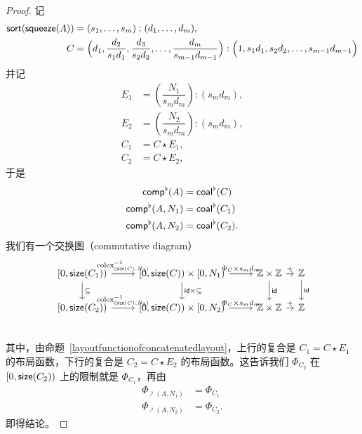 \begin{proof}
    记
    \begin{align*}
    \mathsf{sort}(\mathsf{squeeze}(A)) & = (s_1,\dots,s_m):(d_1,\dots,d_m), \\
    C & = \Bigl(d_1 , \dfrac{d_2}{s_1d_1} , \dfrac{d_3}{s_2d_2} , \dots ,\dfrac{d_m}{s_{m-1}d_{m-1}} \Bigr) : \Bigl(1 , s_1d_1 , s_2d_2, \dots ,s_{m-1}d_{m-1}\Bigr)
    \end{align*}
    并记
    \begin{align*}
    E_1 & = \left( \dfrac{N_1}{s_md_m}\right):(s_md_m), \\
    E_2 & = \left( \dfrac{N_2}{s_md_m}\right):(s_md_m), \\
    C_1 & = C \star E_1,\\
    C_2 & = C \star E_2,
    \end{align*}
    于是
    \begin{align*}
        \mathsf{comp}^\flat (A) & = \mathsf{coal}^\flat(C)\\
        \mathsf{comp}^\flat(A,N_1) & = \mathsf{coal}^\flat(C_1)\\
        \mathsf{comp}^\flat(A,N_2) & = \mathsf{coal}^\flat(C_2).
    \end{align*}
    我们有一个交换图（commutative diagram）
    \[\begin{tikzcd}[column sep=0.8em]  %
    {[}0,\size(C_1){)}\ar[rrr,"\text{colex}_{(\size(C),N_1)}^{-1}"] \ar[d,"\subseteq"] & & & {[}0,\size(C){)} \times {[}0,N_1 {)} \ar[rrr,"\Phi_C \times s_md_m "] \ar[d,"\id \times \subseteq"] & & & \mathbb{Z} \times \mathbb{Z} \ar[r,"+"] \ar[d,"\id" ] & \mathbb{Z} \ar[d,"\id"] \\
    {[}0,\size(C_2){)}\ar[rrr,"\text{colex}_{(\size(C),N_2)}^{-1}"] & & & {[}0,\size(C){)} \times {[}0,N_2 {)} \ar[rrr,"\Phi_C \times s_md_m "] & & & \mathbb{Z} \times \mathbb{Z} \ar[r,"+"] & \mathbb{Z} \\
    \end{tikzcd} \]
    其中，由命题~\ref{layoutfunctionofconcatenatedlayout}，上行的复合是 $C_1 = C \star E_1$ 的布局函数，下行的复合是 $C_2 = C \star E_2$ 的布局函数。这告诉我们 $\Phi_{C_2}$ 在 $[0,\mathsf{size}(C_2))$ 上的限制就是 $\Phi_{C_1}$，再由
    \begin{align*}
    \Phi_{\comp^\flat (A,N_1)}&  = \Phi_{C_1}\\
    \Phi_{\comp^\flat (A,N_2)}&  = \Phi_{C_2}.
    \end{align*}
    即得结论。
\end{proof}


\newpage

